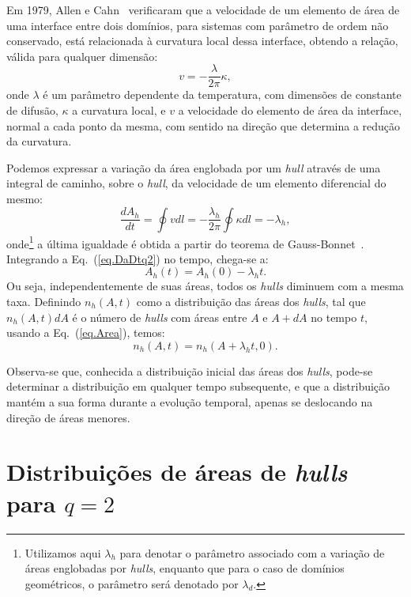 Em 1979, Allen e Cahn~\cite{AllenCahn} verificaram que a velocidade de um elemento de área de uma interface entre dois domínios, para sistemas com parâmetro de ordem não conservado, está relacionada à curvatura local dessa interface, obtendo a relação, válida para qualquer dimensão:
\begin{equation}
 \label{eq.AllenCahn}
 v=-\frac{\lambda}{2\pi} \kappa,
\end{equation}
onde $\lambda$ é um parâmetro dependente da temperatura, com dimensões de constante de difusão, $\kappa$ a curvatura local, e $v$ a velocidade do elemento de área da interface, normal a cada ponto da mesma, com sentido na direção que determina a redução da curvatura.

Podemos expressar a variação da área englobada por um \textit{hull} através de uma integral de caminho, sobre o \textit{hull}, da velocidade de um elemento diferencial do mesmo:
\begin{equation}
 \label{eq.DaDtq2}
 \frac{dA_h}{dt} = \oint v dl = -\frac{\lambda_h}{2\pi} \oint \kappa dl = -\lambda_h,
\end{equation}
onde\footnote{Utilizamos aqui $\lambda_h$ para denotar o parâmetro associado com a variação de áreas englobadas por \textit{hulls}, enquanto que para o caso de domínios geométricos, o parâmetro será denotado por $\lambda_d$.} a última igualdade é obtida a partir do teorema de Gauss-Bonnet~\cite{PRLJeferson}. Integrando a Eq.~(\ref{eq.DaDtq2}) no tempo, chega-se a:
\begin{equation}
 \label{eq.Area}
 A_h(t) = A_h(0) - \lambda_h t.
\end{equation}
Ou seja, independentemente de suas áreas, todos os \textit{hulls} diminuem com a mesma taxa. Definindo $n_h(A,t)$ como a distribuição das áreas dos \textit{hulls}, tal que $n_h(A, t)dA$ é o número de \textit{hulls} com áreas entre $A$ e $A+dA$ no tempo $t$, usando a Eq.~(\ref{eq.Area}), temos:
\begin{equation}
 \label{eq.DistHulls}
 n_h(A,t) = n_h(A+\lambda_h t,0).
\end{equation}

Observa-se que, conhecida a distribuição inicial das áreas dos \textit{hulls}, pode-se determinar a distribuição em qualquer tempo subsequente, e que a distribuição mantém a sua forma durante a evolução temporal, apenas se deslocando na direção de áreas menores.


\section{Distribuições de áreas de \textit{hulls} para $q=2$}

